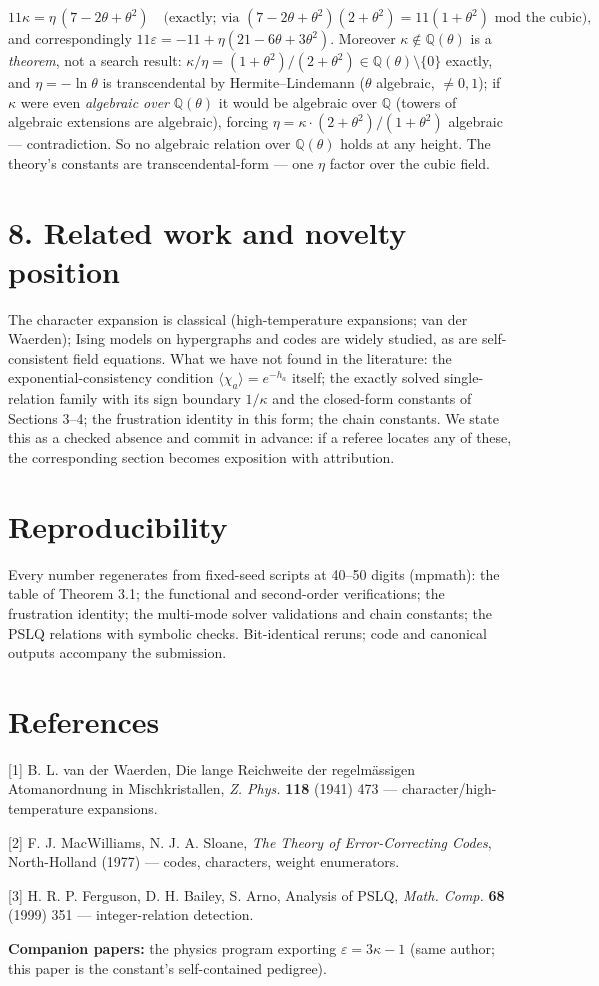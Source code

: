 \documentclass[11pt]{article}
\begin{document}
\[
11\kappa = \eta\,(7 - 2\theta + \theta^2)
\quad\text{(exactly; via } (7-2\theta+\theta^2)(2+\theta^2) =
11(1+\theta^2) \text{ mod the cubic)},
\]
and correspondingly $11\varepsilon = -11 + \eta(21 - 6\theta + 3\theta^2)$.  Moreover $\kappa \notin \mathbb Q(\theta)$ is a \emph{theorem}, not a search result: $\kappa/\eta = (1+\theta^2)/ (2+\theta^2) \in \mathbb Q(\theta)\setminus\{0\}$ exactly, and $\eta = -\ln\theta$ is transcendental by Hermite–Lindemann ($\theta$ algebraic, $\neq 0, 1$); if $\kappa$ were even \emph{algebraic over} $\mathbb Q(\theta)$ it would be algebraic over $\mathbb Q$ (towers of algebraic extensions are algebraic), forcing $\eta = \kappa\cdot(2+\theta^2)/(1+\theta^2)$ algebraic — contradiction.  So no algebraic relation over $\mathbb Q(\theta)$ holds at any height.  The theory's constants are transcendental-form — one $\eta$ factor over the cubic field.

\section*{8. Related work and novelty position}
The character expansion is classical (high-temperature expansions; van der Waerden); Ising models on hypergraphs and codes are widely studied, as are self-consistent field equations.  What we have not found in the literature: the exponential-consistency condition $\langle\chi_a\rangle = e^{-h_a}$ itself; the exactly solved single-relation family with its sign boundary $1/\kappa$ and the closed-form constants of Sections 3–4; the frustration identity in this form; the chain constants.  We state this as a checked absence and commit in advance: if a referee locates any of these, the corresponding section becomes exposition with attribution.

\section*{Reproducibility}
Every number regenerates from fixed-seed scripts at 40–50 digits (mpmath): the table of Theorem 3.1; the functional and second-order verifications; the frustration identity; the multi-mode solver validations and chain constants; the PSLQ relations with symbolic checks.  Bit-identical reruns; code and canonical outputs accompany the submission.

\section*{References}
[1] B. L. van der Waerden, Die lange Reichweite der regelmässigen Atomanordnung in Mischkristallen, \emph{Z. Phys.} \textbf{118} (1941) 473 — character/high-temperature expansions.

[2] F. J. MacWilliams, N. J. A. Sloane, \emph{The Theory of Error-Correcting Codes}, North-Holland (1977) — codes, characters, weight enumerators.

[3] H. R. P. Ferguson, D. H. Bailey, S. Arno, Analysis of PSLQ, \emph{Math. Comp.} \textbf{68} (1999) 351 — integer-relation detection.

\textbf{Companion papers:} the physics program exporting $\varepsilon = 3\kappa - 1$ (same author; this paper is the constant's self-contained pedigree).
\end{document}
